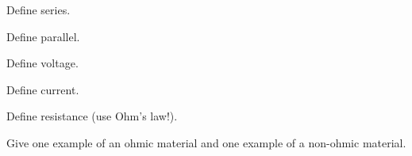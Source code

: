 \documentclass{exam}
\begin{document}
\begin{questions}
\newpage{}

\question Define series.
\vfill{}

\question Define parallel.
\vfill{}

\question Define voltage.
\vfill{}

\question Define current.
\vfill{}

\question Define resistance (use Ohm's law!).
\vfill{}

\question Give one example of an ohmic material and one example of a non-ohmic material.
\vfill{}


\end{questions}
\end{document}
